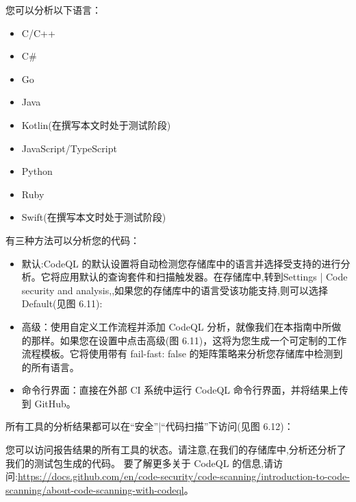 您可以分析以下语言：

\begin{itemize}
\item 
C/C++

\item 
C\#

\item 
Go

\item 
Java

\item 
Kotlin(在撰写本文时处于测试阶段)

\item 
JavaScript/TypeScript

\item 
Python

\item 
Ruby

\item 
Swift(在撰写本文时处于测试阶段)
\end{itemize}

有三种方法可以分析您的代码：

\begin{itemize}
\item 
默认:CodeQL 的默认设置将自动检测您存储库中的语言并选择受支持的进行分析。它将应用默认的查询套件和扫描触发器。在存储库中,转到Settings | Code security and analysis,,如果您的存储库中的语言受该功能支持,则可以选择Default(见图 6.11):


\item 
高级：使用自定义工作流程并添加 CodeQL 分析，就像我们在本指南中所做的那样。如果您在设置中点击高级(图 6.11)，这将为您生成一个可定制的工作流程模板。它将使用带有 fail-fast: false 的矩阵策略来分析您存储库中检测到的所有语言。

\item 
命令行界面：直接在外部 CI 系统中运行 CodeQL 命令行界面，并将结果上传到 GitHub。
\end{itemize}

所有工具的分析结果都可以在“安全”|“代码扫描”下访问(见图 6.12)：


您可以访问报告结果的所有工具的状态。请注意,在我们的存储库中,分析还分析了我们的测试包生成的代码。
要了解更多关于 CodeQL 的信息,请访问:\url{https://docs.github.com/en/code-security/code-scanning/introduction-to-code-scanning/about-code-scanning-with-codeql}。

